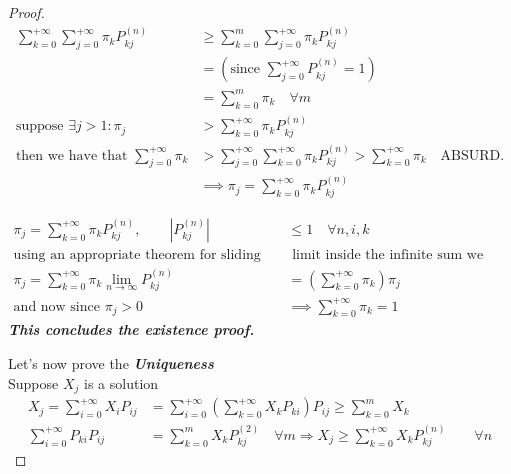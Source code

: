 \begin{proof}
		\proofpart
			\begin{equation*}
				\begin{split}
					\sum\limits_{k=0}^{+\infty} \sum\limits_{j=0}^{+\infty} \pi_k P_{kj}^{(n)} &\geq
					\sum\limits_{k=0}^m \sum\limits_{j=0}^{+\infty} \pi_k P_{kj}^{(n)}  \\
					&=(\text{since } \sum\limits_{j=0}^{+\infty} P_{kj}^{(n)} = 1 )\\
					&=\sum\limits_{k=0}^m \pi_k \quad \forall m\\
					\text{suppose } \exists j > 1 : \pi_j &> \sum\limits_{k=0}^{+\infty} \pi_k P_{kj}^{(n)} \\
					\text{then we have that } \sum\limits_{j=0}^{+\infty} \pi_k &> \sum\limits_{j=0}^{+\infty} \sum\limits_{k=0}^{+\infty} \pi_k P_{kj}^{(n)} > \sum\limits_{k=0}^{+\infty} \pi_k \quad \text{ABSURD.} \\
					&\implies \pi_j = \sum\limits_{k=0}^{+\infty} \pi_k P_{kj}^{(n)}
				\end{split}
			\end{equation*}

		\proofpart
			\begin{equation*}
				\begin{split}
			 		\pi_j = \sum\limits_{k=0}^{+\infty} \pi_k P_{kj}^{(n)}, \qquad |P_{kj}^{(n)}| &\leq 1 \quad \forall n,i,k \\
					\text{using an appropriate theorem for sliding the}&\text{ limit inside the infinite sum we have:}\\
					\pi_j = \sum\limits_{k=0}^{+\infty}  \pi_k \lim_{n\to\infty} P_{kj}^{(n)} &= (\sum\limits_{k=0}^{+\infty} \pi_k) \pi_j\\
					\text{and now since $\pi_j>0$}
					&\implies \sum\limits_{k=0}^{+\infty} \pi_k = 1
				\end{split}
			\end{equation*}
			\textbf{\textit{This concludes the existence proof.}}

		\proofpart
			Let's now prove the \textbf{\textit{Uniqueness}} \\
			Suppose $X_j$ is a solution
			\begin{equation}
				\begin{split}
					X_j =
					 \sum\limits_{i=0}^{+\infty} X_i P_{ij} &=
					 \sum\limits_{i=0}^{+\infty} ( \sum\limits_{k=0}^{+\infty} X_k P_{ki} ) P_{ij} \geq
					 \sum\limits_{k=0}^m X_k \\
					 \sum\limits_{i=0}^{+\infty} P_{ki} P_{ij} &= \sum\limits_{k=0}^m X_k P_{kj}^{(2)}
					 \quad \forall m
					 \Rightarrow X_j \geq \sum\limits_{k=0}^{+\infty} X_k P_{kj}^{(n)}\qquad \forall n
				\end{split}
			\end{equation}


\end{proof}
